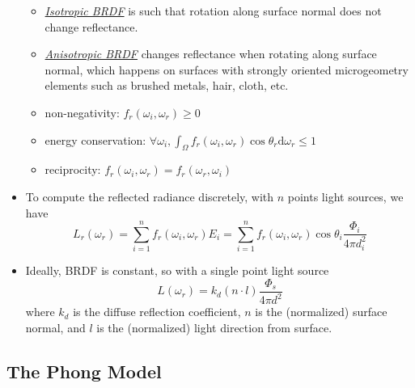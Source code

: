 \documentclass[twocolumn,landscape,10pt]{article}
\theoremstyle{definition}
\begin{document}
\begin{itemize}
        \begin{itemize}
            \item \underline{\emph{Isotropic BRDF}} is such that rotation along
                surface normal does not change reflectance.
            \item \underline{\emph{Anisotropic BRDF}} changes reflectance when
                rotating along surface normal, which happens on surfaces with
                strongly oriented microgeometry elements such as brushed metals,
                hair, cloth, etc.
            \item non-negativity: $f_r(\omega_i,\omega_r)\ge 0$
            \item energy conservation: $\forall\omega_i, \int_\Omega
                f_r(\omega_i,\omega_r)\cos{\theta_r}\mathrm{d}\omega_r\le 1$
            \item reciprocity: $f_r(\omega_i,\omega_r)=f_r(\omega_r,\omega_i)$
        \end{itemize} 
    \item To compute the reflected radiance discretely, with $n$ points light
        sources, we have
        \[
            L_r(\omega_r)=\sum_{i=1}^{n} f_r(\omega_i,\omega_r)E_i
            =\sum_{i=1}^{n}
            f_r(\omega_i,\omega_r)\cos{\theta_i}\frac{\Phi_i}{4\pi d_i^2}
        \]
    \item Ideally, BRDF is constant, so with a single point light source
        \[
            L(\omega_r)=k_d(n\cdot l) \frac{\Phi_s}{4\pi d^2}
        \]
        where $k_d$ is the diffuse reflection coefficient,
        $n$ is the (normalized) surface normal,
        and $l$ is the (normalized) light direction from surface.
\end{itemize} 

\subsection{The Phong Model}
\end{document}
